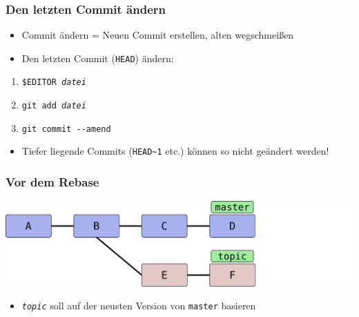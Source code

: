 \documentclass{beamer}
\begin{document}
\begin{frame}

	\frametitle{Den letzten Commit ändern}
\begin{itemize}
	\item Commit ändern = Neuen Commit erstellen, alten wegschmeißen
	\item Den letzten Commit (\texttt{HEAD}) ändern:
\end{itemize}

\begin{enumerate}
	\item \texttt{\$EDITOR \emph{datei}}
	\item \texttt{git add \emph{datei}}
	\item \texttt{git commit -{}-amend}
\end{enumerate}

\begin{itemize}
	\item Tiefer liegende Commits (\texttt{HEAD\textasciitilde{}1} etc.) können so nicht geändert werden!
\end{itemize}

\end{frame}

\begin{frame}
	\frametitle{Vor dem Rebase}

	\begin{center}
		\includegraphics[scale=0.12]{bilder/rebase-vorher.pdf}
	\end{center}

	\begin{itemize}
		\item \texttt{\emph{topic}} soll auf der neusten Version von \texttt{master} basieren
	\end{itemize}

\end{frame}
\end{document}

